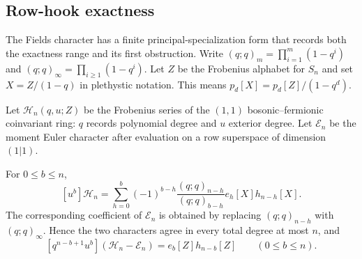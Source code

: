 \subsection{Row-hook exactness}
\label{sec:hook-homology}

The Fields character has a finite principal-specialization form
that records both the exactness range and its first obstruction.
Write $(q;q)_m=\prod_{i=1}^m(1-q^i)$ and
$(q;q)_\infty=\prod_{i\ge1}(1-q^i)$.
Let $Z$ be the Frobenius alphabet for $S_n$ and set
$X=Z/(1-q)$ in plethystic notation. This means
$p_d[X]=p_d[Z]/(1-q^d)$.

Let $\mathscr H_n(q,u;Z)$ be the Frobenius series of the
$(1,1)$ bosonic--fermionic coinvariant ring: $q$ records polynomial
degree and $u$ exterior degree. Let $\mathscr E_n$ be the
moment Euler character after evaluation on a row superspace of
dimension $(1|1)$.

\begin{lemma}
\label{lem:fields-euler}
For $0\le b\le n$,
\begin{equation}\label{eq:finite-fields}
 [u^b]\mathscr H_n
  =\sum_{h=0}^b(-1)^{b-h}
       \frac{(q;q)_{n-h}}{(q;q)_{b-h}}e_h[X]h_{n-h}[X].
\end{equation}
The corresponding coefficient of $\mathscr E_n$ is obtained by
replacing $(q;q)_{n-h}$ with $(q;q)_\infty$. Hence the two
characters agree in every total degree at most $n$, and
\begin{equation}\label{eq:first-fields-discrepancy}
 [q^{n-b+1}u^b](\mathscr H_n-\mathscr E_n)
       =e_b[Z]h_{n-b}[Z]\qquad(0\le b\le n).
\end{equation}
\end{lemma}

